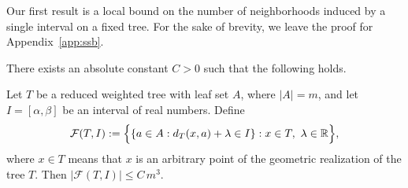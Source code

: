 \documentclass[a4paper,UKenglish,cleveref,autoref,thm-restate]{socg-lipics-v2021}
\begin{document}
Our first result is a local bound on the number of neighborhoods induced by a single
interval on a fixed tree. For the sake of brevity, we leave the proof for Appendix~\ref{app:ssb}.

\begin{lemma}\label{lem:single-shell-bound}
There exists an absolute constant \(C>0\) such that the following holds.

Let \(T\) be a reduced weighted tree with leaf set \(A\), where \(|A|=m\), and let
\(I=[\alpha,\beta]\) be an interval of real numbers. Define
\[
\mathcal F(T,I):=
\Bigl\{
\{a\in A:d_T(x,a)+\lambda\in I\}: x\in T,\ \lambda\in\mathbb R
\Bigr\},
\]
where \(x\in T\) means that \(x\) is an arbitrary point of the geometric realization of
the tree \(T\). Then
\(
|\mathcal F(T,I)|\le C\,m^3.
\)
\end{lemma}




\end{document}
